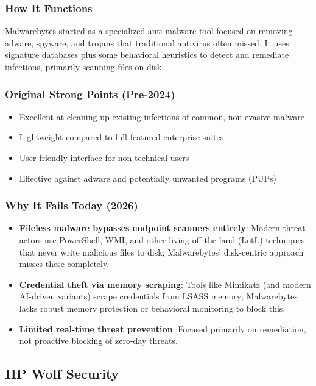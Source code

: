 \documentclass[12pt,letterpaper]{report}
\begin{document}
\subsubsection{How It Functions}
Malwarebytes started as a specialized anti-malware tool focused on removing adware, spyware, and trojans that traditional antivirus often missed. It uses signature databases plus some behavioral heuristics to detect and remediate infections, primarily scanning files on disk.

\subsubsection{Original Strong Points (Pre-2024)}
\begin{itemize}
    \item Excellent at cleaning up existing infections of common, non-evasive malware
    \item Lightweight compared to full-featured enterprise suites
    \item User-friendly interface for non-technical users
    \item Effective against adware and potentially unwanted programs (PUPs)
\end{itemize}

\subsubsection{Why It Fails Today (2026)}
\begin{itemize}
    \item \textbf{Fileless malware bypasses endpoint scanners entirely}: Modern threat actors use PowerShell, WMI, and other living-off-the-land (LotL) techniques that never write malicious files to disk; Malwarebytes' disk-centric approach misses these completely.
    \item \textbf{Credential theft via memory scraping}: Tools like Mimikatz (and modern AI-driven variants) scrape credentials from LSASS memory; Malwarebytes lacks robust memory protection or behavioral monitoring to block this.
    \item \textbf{Limited real-time threat prevention}: Focused primarily on remediation, not proactive blocking of zero-day threats.
\end{itemize}

\subsection{HP Wolf Security}
\end{document}
